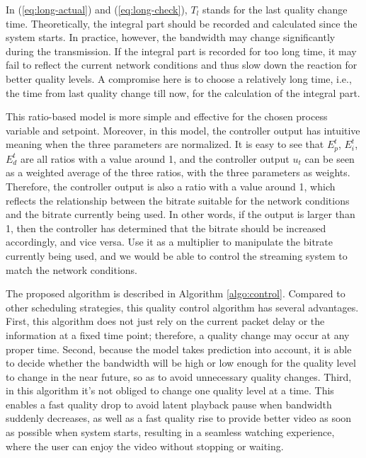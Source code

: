 \documentclass[journal,draftclsnofoot,onecolumn]{IEEEtran}
\begin{document}
In (\ref{eq:long-actual}) and (\ref{eq:long-check}), $T_l$ stands for the last quality change time. Theoretically, the integral part should be recorded and calculated since the system starts. In practice, however, the bandwidth may change significantly during the transmission. If the integral part is recorded for too long time, it may fail to reflect the current network conditions and thus slow down the reaction for better quality levels. A compromise here is to choose a relatively long time, i.e., the time from last quality change till now, for the calculation of the integral part.

This ratio-based model is more simple and effective for the chosen process variable and setpoint. Moreover, in this model, the controller output has intuitive meaning when the three parameters are normalized. It is easy to see that $E_p^t$, $E_i^t$, $E_d^t$ are all ratios with a value around 1, and the controller output $u_t$ can be seen as a weighted average of the three ratios, with the three parameters as weights. Therefore, the controller output is also a ratio with a value around 1, which reflects the relationship between the bitrate suitable for the network conditions and the bitrate currently being used. In other words, if the output is larger than 1, then the controller has determined that the bitrate should be increased accordingly, and vice versa. Use it as a multiplier to manipulate the bitrate currently being used, and we would be able to control the streaming system to match the network conditions.

The proposed algorithm is described in Algorithm \ref{algo:control}. Compared to other scheduling strategies, this quality control algorithm has several advantages. First, this algorithm does not just rely on the current packet delay or the information at a fixed time point; therefore, a quality change may occur at any proper time. Second, because the model takes prediction into account, it is able to decide whether the bandwidth will be high or low enough for the quality level to change in the near future, so as to avoid unnecessary quality changes. Third, in this algorithm it's not obliged to change one quality level at a time. This enables a fast quality drop to avoid latent playback pause when bandwidth suddenly decreases, as well as a fast quality rise to provide better video as soon as possible when system starts, resulting in a seamless watching experience, where the user can enjoy the video without stopping or waiting.
\end{document}
